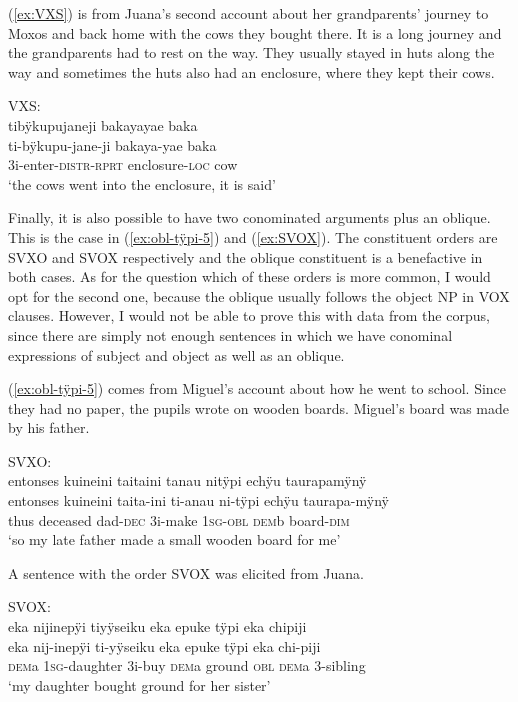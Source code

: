 (\ref{ex:VXS}) is from Juana’s second account about her grandparents’ journey to Moxos and back home with the cows they bought there. It is a long journey and the grandparents had to rest on the way. They usually stayed in huts along the way and sometimes the huts also had an enclosure, where they kept their cows.

\ea\label{ex:VXS}
\begingl
\glpreamble \textup{VXS:}\\tibÿkupujaneji bakayayae baka\\
\gla ti-bÿkupu-jane-ji bakaya-yae baka\\
\glb 3i-enter-\textsc{distr}-\textsc{rprt} enclosure-\textsc{loc} cow\\
\glft ‘the cows went into the enclosure, it is said’
\endgl
\trailingcitation{[jxx-p151016l-2.166]}
\xe


Finally, it is also possible to have two conominated arguments plus an oblique. This is the case in (\ref{ex:obl-tÿpi-5}) and (\ref{ex:SVOX}). The constituent orders are SVXO and SVOX respectively and the oblique constituent is a benefactive in both cases. As for the question which of these orders is more common, I would opt for the second one, because the oblique usually follows the object NP in VOX clauses. However, I would not be able to prove this with data from the corpus, since there are simply not enough sentences in which we have conominal expressions of subject and object as well as an oblique.

(\ref{ex:obl-tÿpi-5}) comes from Miguel’s account about how he went to school. Since they had no paper, the pupils wrote on wooden boards. Miguel’s board was made by his father.


\ea\label{ex:obl-tÿpi-5}
\begingl
\glpreamble \textup{SVXO:}\\entonses kuineini taitaini tanau nitÿpi echÿu taurapamÿnÿ\\
\gla entonses kuineini taita-ini ti-anau ni-tÿpi echÿu taurapa-mÿnÿ\\
\glb thus deceased dad-\textsc{dec} 3i-make 1\textsc{sg}-\textsc{obl} \textsc{dem}b board-\textsc{dim}\\
\glft ‘so my late father made a small wooden board for me’
\endgl
\trailingcitation{[mxx-p181027l-1.023]}
\xe


A sentence with the order SVOX was elicited from Juana.


\ea\label{ex:SVOX}
\begingl
\glpreamble \textup{SVOX:}\\ eka nijinepÿi tiyÿseiku eka epuke tÿpi eka chipiji\\
\gla eka nij-inepÿi ti-yÿseiku eka epuke tÿpi eka chi-piji\\
\glb \textsc{dem}a 1\textsc{sg}-daughter 3i-buy \textsc{dem}a ground \textsc{obl} \textsc{dem}a 3-sibling\\
\glft ‘my daughter bought ground for her sister’
\endgl
\trailingcitation{[jxx-e191021e-2]}
\xe


